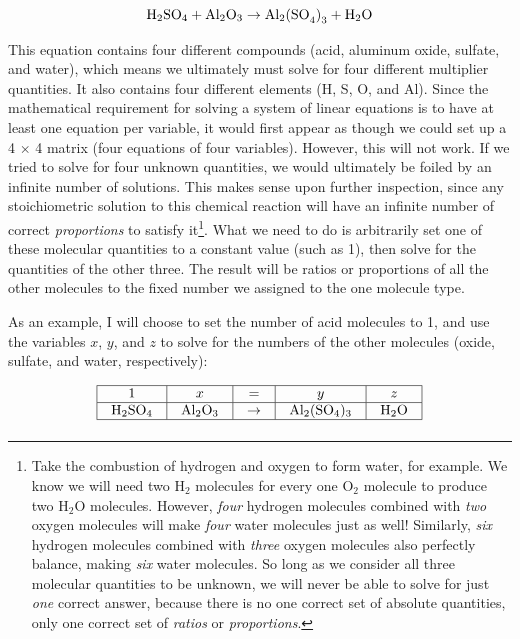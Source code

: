 $$\hbox{H}_2\hbox{SO}_4 + \hbox{Al}_2\hbox{O}_3 \rightarrow \hbox{Al}_2\hbox{(SO}_4\hbox{)}_3 + \hbox{H}_2\hbox{O}$$

This equation contains four different compounds (acid, aluminum oxide, sulfate, and water), which means we ultimately must solve for four different multiplier quantities.  It also contains four different elements (H, S, O, and Al).  Since the mathematical requirement for solving a system of linear equations is to have at least one equation per variable, it would first appear as though we could set up a 4 $\times$ 4 matrix (four equations of four variables).  However, this will not work.  If we tried to solve for four unknown quantities, we would ultimately be foiled by an infinite number of solutions.  This makes sense upon further inspection, since any stoichiometric solution to this chemical reaction will have an infinite number of correct \textit{proportions} to satisfy it\footnote{Take the combustion of hydrogen and oxygen to form water, for example.  We know we will need two H$_{2}$ molecules for every one O$_{2}$ molecule to produce two H$_{2}$O molecules.  However, \textit{four} hydrogen molecules combined with \textit{two} oxygen molecules will make \textit{four} water molecules just as well!  Similarly, \textit{six} hydrogen molecules combined with \textit{three} oxygen molecules also perfectly balance, making \textit{six} water molecules.  So long as we consider all three molecular quantities to be unknown, we will never be able to solve for just \textit{one} correct answer, because there is no one correct set of absolute quantities, only one correct set of \textit{ratios} or \textit{proportions}.}.  What we need to do is arbitrarily set one of these molecular quantities to a constant value (such as 1), then solve for the quantities of the other three.  The result will be ratios or proportions of all the other molecules to the fixed number we assigned to the one molecule type.

\filbreak

As an example, I will choose to set the number of acid molecules to 1, and use the variables $x$, $y$, and $z$ to solve for the numbers of the other molecules (oxide, sulfate, and water, respectively):


$$\vbox{\offinterlineskip
\halign{\strut
\vrule \quad\hfil # \ \hfil & 
\vrule \quad\hfil # \ \hfil & 
\vrule \quad\hfil # \ \hfil & 
\vrule \quad\hfil # \ \hfil & 
\vrule \quad\hfil # \ \hfil \vrule \cr
\noalign{\hrule}
%
1 & $x$ & = & $y$ & $z$ \cr
%
\noalign{\hrule}
%
H$_{2}$SO$_{4}$ & Al$_{2}$O$_{3}$ & $\to$ & Al$_{2}$(SO$_{4}$)$_{3}$ & H$_{2}$O \cr
%
\noalign{\hrule}
} %
}$$ %

